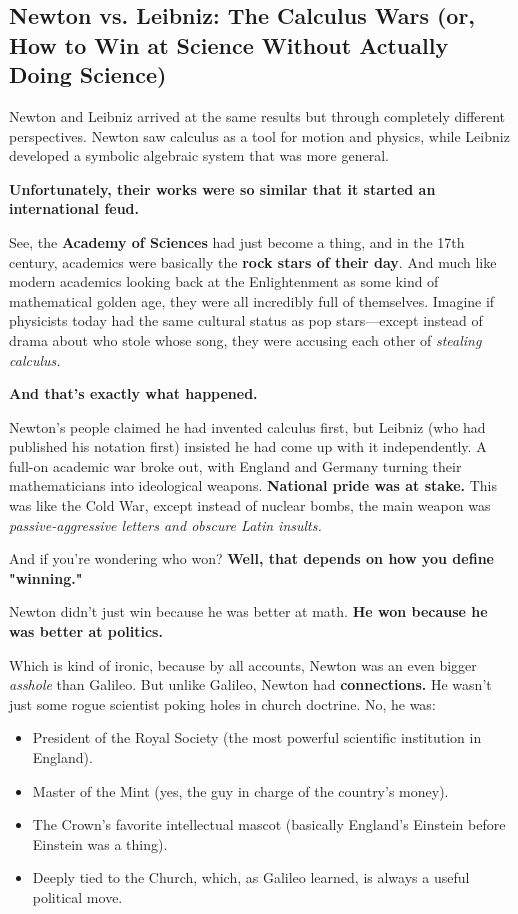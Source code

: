 
\subsection{Newton vs. Leibniz: The Calculus Wars (or, How to Win at Science Without Actually Doing Science)}

Newton and Leibniz arrived at the same results but through completely different perspectives. Newton saw calculus as a tool for motion and physics, while Leibniz developed a symbolic algebraic system that was more general. 

\textbf{Unfortunately, their works were so similar that it started an international feud.} 

See, the \textbf{Academy of Sciences} had just become a thing, and in the 17th century, academics were basically the \textbf{rock stars of their day}. And much like modern academics looking back at the Enlightenment as some kind of mathematical golden age, they were all incredibly full of themselves. Imagine if physicists today had the same cultural status as pop stars—except instead of drama about who stole whose song, they were accusing each other of \textit{stealing calculus.} 

\textbf{And that’s exactly what happened.} 

Newton’s people claimed he had invented calculus first, but Leibniz (who had published his notation first) insisted he had come up with it independently. A full-on academic war broke out, with England and Germany turning their mathematicians into ideological weapons. \textbf{National pride was at stake.} This was like the Cold War, except instead of nuclear bombs, the main weapon was \textit{passive-aggressive letters and obscure Latin insults.} 

And if you’re wondering who won? \textbf{Well, that depends on how you define "winning."} 

Newton didn’t just win because he was better at math. \textbf{He won because he was better at politics.} 

Which is kind of ironic, because by all accounts, Newton was an even bigger \textit{asshole} than Galileo. But unlike Galileo, Newton had \textbf{connections.} He wasn’t just some rogue scientist poking holes in church doctrine. No, he was:  

\begin{itemize}
    \item President of the Royal Society (the most powerful scientific institution in England).  
    \item Master of the Mint (yes, the guy in charge of the country’s money).
    \item The Crown’s favorite intellectual mascot (basically England’s Einstein before Einstein was a thing).
    \item Deeply tied to the Church, which, as Galileo learned, is always a useful political move.
\end{itemize}

